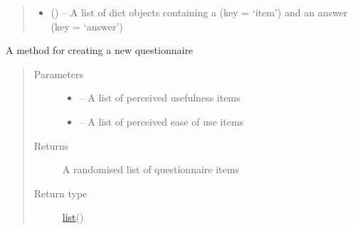 \documentclass[letterpaper,10pt,english]{sphinxmanual}
\begin{document}
\begin{fulllineitems}
\begin{fulllineitems}
\begin{quote}
\begin{description}
\begin{itemize}
\item {} 
 (\href{https://docs.python.org/2/library/stdtypes.html\#dict}{}) -- A list of dict objects containing a  (key = `item') and an answer (key = `answer')

\end{itemize}

\end{description}\end{quote}

\end{fulllineitems}


\begin{fulllineitems}
\label{\detokenize{user:user.User.create_questionnaire}}
A method for creating a new questionnaire
\begin{quote}\begin{description}
\item[{Parameters}] \leavevmode\begin{itemize}
\item {} 
 -- A list of perceived usefulness items

\item {} 
 -- A list of perceived ease of use items

\end{itemize}

\item[{Returns}] \leavevmode
A randomised list of questionnaire items

\item[{Return type}] \leavevmode
\href{https://docs.python.org/2/library/functions.html\#list}{list}({\hyperref[\detokenize{questionnaire_item:questionnaire_item.QuestionnaireItem}]{}})

\end{description}\end{quote}

\end{fulllineitems}



\end{fulllineitems}
\end{document}
